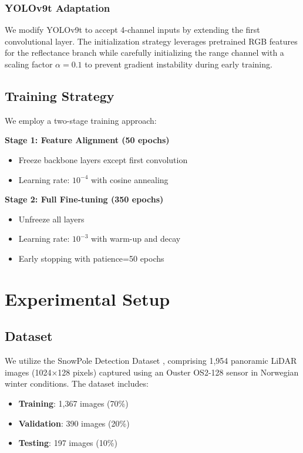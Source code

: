 \documentclass[runningheads]{llncs}
\begin{document}
\subsubsection{YOLOv9t Adaptation}

We modify YOLOv9t to accept 4-channel inputs by extending the first convolutional layer. The initialization strategy leverages pretrained RGB features for the reflectance branch while carefully initializing the range channel with a scaling factor $\alpha=0.1$ to prevent gradient instability during early training.

\subsection{Training Strategy}

We employ a two-stage training approach:

\textbf{Stage 1: Feature Alignment (50 epochs)}
\begin{itemize}
    \item Freeze backbone layers except first convolution
    \item Learning rate: $10^{-4}$ with cosine annealing
\end{itemize}

\textbf{Stage 2: Full Fine-tuning (350 epochs)}
\begin{itemize}
    \item Unfreeze all layers
    \item Learning rate: $10^{-3}$ with warm-up and decay
    \item Early stopping with patience=50 epochs
\end{itemize}

\section{Experimental Setup}

\subsection{Dataset}

We utilize the SnowPole Detection Dataset \cite{bavirisetti2025snowpole}, comprising 1,954 panoramic LiDAR images (1024×128 pixels) captured using an Ouster OS2-128 sensor in Norwegian winter conditions. The dataset includes:
\begin{itemize}
    \item \textbf{Training}: 1,367 images (70\%)
    \item \textbf{Validation}: 390 images (20\%)
    \item \textbf{Testing}: 197 images (10\%)
\end{itemize}
\end{document}
